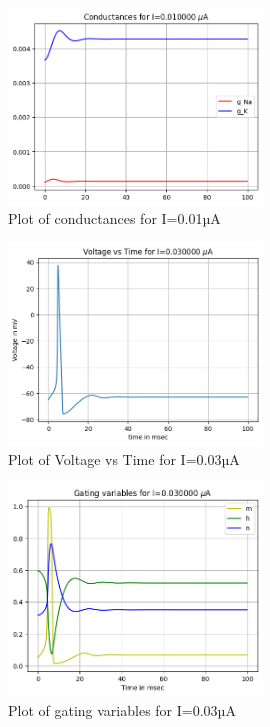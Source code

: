\documentclass[12pt,a4paper]{report}
\begin{document}
\begin{figure}[H]
    \centering
    \includegraphics[width=0.6\textwidth]{./data/conductances_0_01uA.png}
    \caption{Plot of conductances for I=0.01µA}
    \label{fig:conductances_0_01uA}
\end{figure}



\begin{figure}[H]
    \centering
    \includegraphics[width=0.6\textwidth]{./data/voltage_time_0_03uA.png}
    \caption{Plot of Voltage vs Time for I=0.03µA}
    \label{fig:voltage_time_0_03uA}
\end{figure}

\begin{figure}[H]
    \centering
    \includegraphics[width=0.6\textwidth]{./data/gating_variables_0_03uA.png}
    \caption{Plot of gating variables for I=0.03µA}
    \label{fig:gating_variables_0_03uA}
\end{figure}
\end{document}

